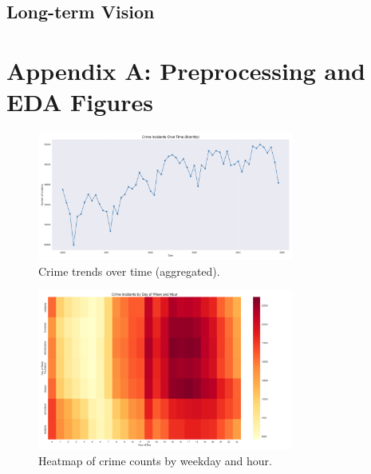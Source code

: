 \documentclass{article}
\begin{document}
\subsection{Long-term Vision}
\section{Appendix A: Preprocessing and EDA Figures}

\begin{figure}[H]
\centering
\includegraphics[width=0.75\textwidth]{crime_trends_over_time.png}
\caption{Crime trends over time (aggregated).}
\end{figure}

\begin{figure}[H]
\centering
\includegraphics[width=0.75\textwidth]{crime_heatmap_day_hour.png}
\caption{Heatmap of crime counts by weekday and hour.}
\end{figure}
\end{document}
